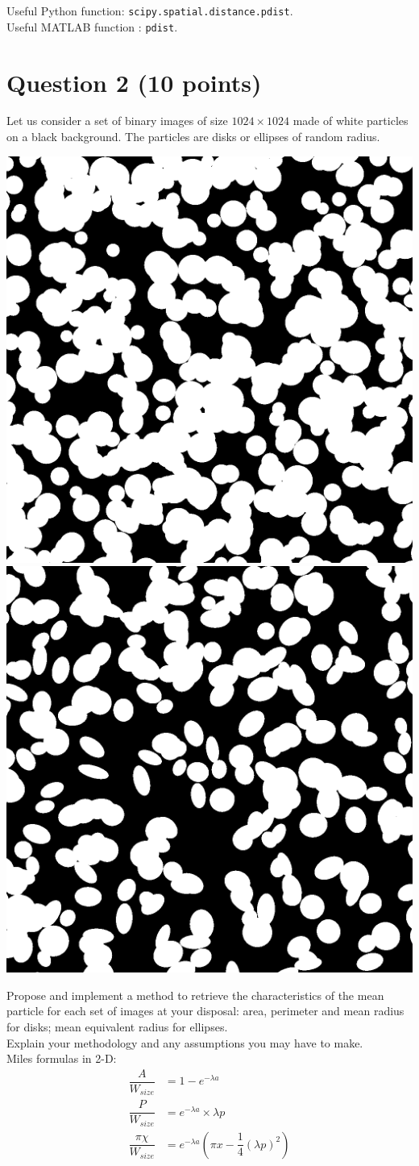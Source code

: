\documentclass{article}
\begin{document}
Useful Python function: \texttt{scipy.spatial.distance.pdist}.\\

Useful MATLAB function	: \texttt{pdist}.




















\section{Question 2 (10 points)}
Let us consider a set of binary images of size $1024\times 1024$ made of white particles on a black background. The particles are disks or ellipses of random radius.

\begin{center}
\includegraphics[width=.3\textwidth]{I_400_2.png}
\qquad
\includegraphics[width=.3\textwidth]{I_250_7.png}
\end{center}

Propose and implement a method to retrieve the characteristics of the mean particle for each set of images at your disposal: area, perimeter and mean radius for disks; mean equivalent radius for ellipses.\\

Explain your methodology and any assumptions you may have to make.\\

Miles formulas in 2-D:
\begin{align}
\dfrac{A}{W_{size}} & = 1-e^{-\lambda a}\\
\dfrac{P}{W_{size}} & = e^{-\lambda a}\times \lambda p\\
\dfrac{\pi \chi}{W_{size}} & = e^{-\lambda a} \left( \pi x - \dfrac{1}{4}(\lambda p)^2 \right)
\end{align}
\end{document}
